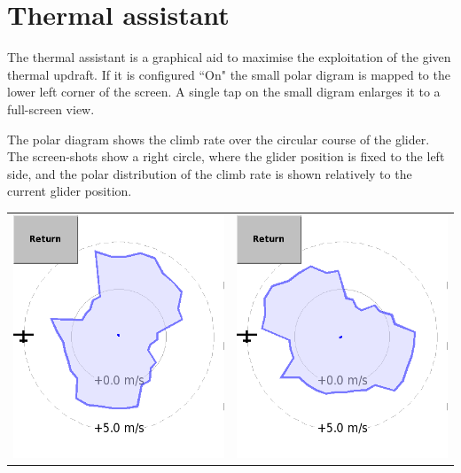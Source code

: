 \section{Thermal assistant}\label{sec:thermal-assistant}

The thermal assistant is a graphical aid to maximise the exploitation of the
given thermal updraft. If it is configured ``On"  the
small polar digram is mapped to the lower left corner of the screen. A
single tap on the small digram enlarges it to a full-screen view. 

The polar diagram shows the climb rate over the circular course of the glider.
The screen-shots show a right circle, where the glider position is fixed to the
left side, and the polar distribution of the climb rate is shown relatively to
the current glider position.


\begin{tabular}{c c}
\includegraphics[angle=0,width=0.5\linewidth,keepaspectratio='true']{figures/dialog-thermal-assistant0.png}&
\includegraphics[angle=0,width=0.5\linewidth,keepaspectratio='true']{figures/dialog-thermal-assistant1.png}\\
\end{tabular}

